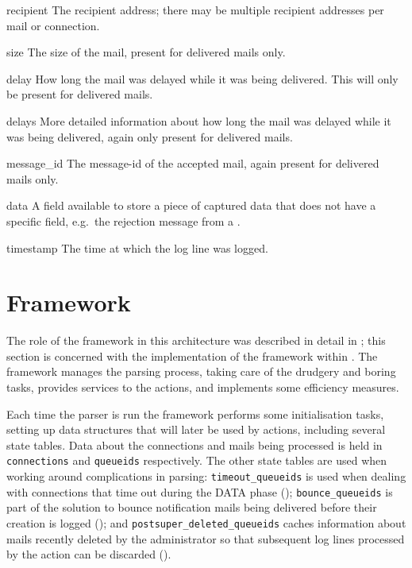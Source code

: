 \begin{boldeqlist}
    \item [recipient] The recipient address; there may be multiple
        recipient addresses per mail or connection.

    \item [size] The size of the mail, present for delivered mails only.

    \item [delay] How long the mail was delayed while it was being
        delivered.  This will only be present for delivered mails.

    \item [delays] More detailed information about how long the mail was
        delayed while it was being delivered, again only present for
        delivered mails.

    \item [message\_id] The message-id of the accepted mail, again present
        for delivered mails only.

    \item [data] A field available to store a piece of captured data that
        does not have a specific field, e.g.\ the rejection message from a
        \@.

    \item [timestamp] The time at which the log line was logged.

\end{boldeqlist}



\section{Framework}

The role of the framework in this architecture was described in detail in
; this section is concerned with the
implementation of the framework within \parsername{}.  The framework
manages the parsing process, taking care of the drudgery and boring tasks,
provides services to the actions, and implements some efficiency measures.

Each time the parser is run the framework performs some initialisation
tasks, setting up data structures that will later be used by actions,
including several state tables.  Data about the connections and mails being
processed is held in \texttt{connections} and \texttt{queueids}
respectively.  The other state tables are used when working around
complications in parsing: \texttt{timeout\_queueids} is used when dealing
with connections that time out during the DATA phase (); \texttt{bounce\_queueids} is part of the solution to
bounce notification mails being delivered before their creation is logged
(); and \texttt{postsuper\_deleted\_queueids} caches information
about mails recently deleted by the administrator so that subsequent log
lines processed by the  action can be discarded
().

